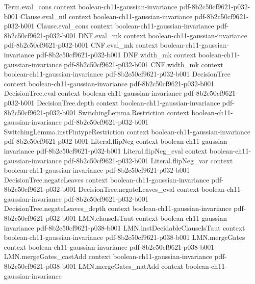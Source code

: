 \begin{theorem}
\proofstep
  {Term.eval_cons}
  {context}
  {boolean-ch11-gaussian-invariance}
  {pdf-8b2c50cf9621-p032-b001}
\proofstep
  {Clause.eval_nil}
  {context}
  {boolean-ch11-gaussian-invariance}
  {pdf-8b2c50cf9621-p032-b001}
\proofstep
  {Clause.eval_cons}
  {context}
  {boolean-ch11-gaussian-invariance}
  {pdf-8b2c50cf9621-p032-b001}
\proofstep
  {DNF.eval_mk}
  {context}
  {boolean-ch11-gaussian-invariance}
  {pdf-8b2c50cf9621-p032-b001}
\proofstep
  {CNF.eval_mk}
  {context}
  {boolean-ch11-gaussian-invariance}
  {pdf-8b2c50cf9621-p032-b001}
\proofstep
  {DNF.width_mk}
  {context}
  {boolean-ch11-gaussian-invariance}
  {pdf-8b2c50cf9621-p032-b001}
\proofstep
  {CNF.width_mk}
  {context}
  {boolean-ch11-gaussian-invariance}
  {pdf-8b2c50cf9621-p032-b001}
\proofstep
  {DecisionTree}
  {context}
  {boolean-ch11-gaussian-invariance}
  {pdf-8b2c50cf9621-p032-b001}
\proofstep
  {DecisionTree.eval}
  {context}
  {boolean-ch11-gaussian-invariance}
  {pdf-8b2c50cf9621-p032-b001}
\proofstep
  {DecisionTree.depth}
  {context}
  {boolean-ch11-gaussian-invariance}
  {pdf-8b2c50cf9621-p032-b001}
\proofstep
  {SwitchingLemma.Restriction}
  {context}
  {boolean-ch11-gaussian-invariance}
  {pdf-8b2c50cf9621-p032-b001}
\proofstep
  {SwitchingLemma.instFintypeRestriction}
  {context}
  {boolean-ch11-gaussian-invariance}
  {pdf-8b2c50cf9621-p032-b001}
\proofstep
  {Literal.flipNeg}
  {context}
  {boolean-ch11-gaussian-invariance}
  {pdf-8b2c50cf9621-p032-b001}
\proofstep
  {Literal.flipNeg_eval}
  {context}
  {boolean-ch11-gaussian-invariance}
  {pdf-8b2c50cf9621-p032-b001}
\proofstep
  {Literal.flipNeg_var}
  {context}
  {boolean-ch11-gaussian-invariance}
  {pdf-8b2c50cf9621-p032-b001}
\proofstep
  {DecisionTree.negateLeaves}
  {context}
  {boolean-ch11-gaussian-invariance}
  {pdf-8b2c50cf9621-p032-b001}
\proofstep
  {DecisionTree.negateLeaves_eval}
  {context}
  {boolean-ch11-gaussian-invariance}
  {pdf-8b2c50cf9621-p032-b001}
\proofstep
  {DecisionTree.negateLeaves_depth}
  {context}
  {boolean-ch11-gaussian-invariance}
  {pdf-8b2c50cf9621-p032-b001}
\proofstep
  {LMN.clauseIsTaut}
  {context}
  {boolean-ch11-gaussian-invariance}
  {pdf-8b2c50cf9621-p038-b001}
\proofstep
  {LMN.instDecidableClauseIsTaut}
  {context}
  {boolean-ch11-gaussian-invariance}
  {pdf-8b2c50cf9621-p038-b001}
\proofstep
  {LMN.mergeGates}
  {context}
  {boolean-ch11-gaussian-invariance}
  {pdf-8b2c50cf9621-p038-b001}
\proofstep
  {LMN.mergeGates_castAdd}
  {context}
  {boolean-ch11-gaussian-invariance}
  {pdf-8b2c50cf9621-p038-b001}
\proofstep
  {LMN.mergeGates_natAdd}
  {context}
  {boolean-ch11-gaussian-invariance}

\end{theorem}
